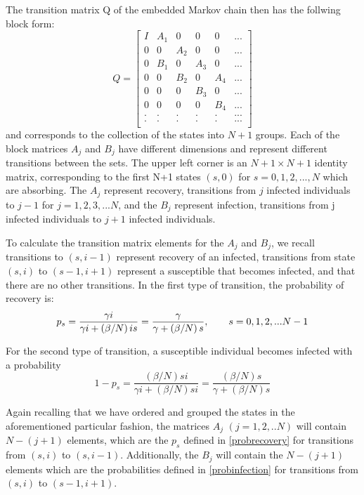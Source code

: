 \documentclass[reqno,11pt]{amsart}
\newcommand{\tab}{\hspace*{2em}}
\begin{document}
The transition matrix Q of the embedded Markov chain then has the follwing block form:
\begin{equation}
Q = 
\begin{bmatrix}
I&    	A_1&     	0&     		0&     		0&... 		\\
0&    	0&        	A_2& 		0& 		0&... 		\\
0& 	B_1& 		0& 		A_3&  		0&... 		\\
0& 	0& 		B_2& 		0&  		A_4&... 	\\
0& 	0& 		0& 		B_3&  		0&... 		\\
0&	0&		0&		0&		B_4&... 	\\
.&	.& 		.&		.&		.&...		\\
.&	.&		.&		.&		.&...		\\
\end{bmatrix}
\end{equation}
and corresponds to the collection of the states into $N+1$ groups. Each of the block matrices $A_j$ and $B_j$ have different dimensions and represent different transitions between the sets. The upper left corner is an $N+1 \times N+1$ identity matrix, corresponding to the first N+1 states $(s,0)$ for $s = 0, 1, 2,...,N $ which are absorbing. The $A_j$ represent recovery, transitions from $ j $ infected individuals to $ j-1 $ for $ j = 1, 2, 3,...N $, and the $B_j$ represent infection, transitions from j infected individuals to $ j +1 $  infected individuals. 

To calculate the transition matrix elements for the $A_j$ and $B_j$, we recall transitions to $(s,i-1)$ represent recovery of an infected, transitions from state $(s,i)$ to $(s-1, i+1)$ represent a susceptible that becomes infected, and that there are no other transitions. In the first type of transition, the probability of recovery is:
\begin{equation}\label{probrecovery}
p_s = \frac{ \gamma i}{ \gamma i + \left (\beta /N \right ) i s} = \frac{ \gamma }{ \gamma + \left ( \beta / N \right ) s}, \text{\tab $s = 0,1,2,...N-1$}
\end{equation}

For the second type of transition, a susceptible individual becomes infected with a probability
\begin{equation}\label{probinfection}
1-p_s = \frac{ \left ( \beta /N \right ) si }{ \gamma i + \left ( \beta /N \right ) s i } = \frac{ ( \beta / N) s }{ \gamma + ( \beta /N) s }
\end{equation}

Again recalling that we have ordered and grouped the states in the aforementioned particular fashion, the matrices $A_j$ $(j = 1,2,..N)$ will contain $N-(j+1)$ elements, which are the $p_s$ defined in \eqref{probrecovery} for transitions from $(s,i)$ to $(s,i-1)$. Additionally, the $B_j$ will contain the $N-(j+1)$ elements which are the probabilities defined in \eqref{probinfection} for transitions from $(s,i)$ to $(s-1,i+1)$.
\end{document}
